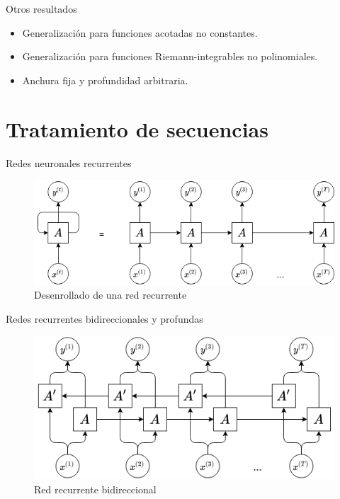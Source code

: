 \documentclass[spanish]{beamer}
\begin{document}
\begin{frame}{Otros resultados}

\begin{itemize}
\item Generalización para funciones acotadas no constantes.
\item Generalización para funciones Riemann-integrables no polinomiales.
\item Anchura fija y profundidad arbitraria.
\end{itemize}

\end{frame}

\section{Tratamiento de secuencias}

\begin{frame}{Redes neuronales recurrentes}

\begin{figure}
\includegraphics[scale=0.5]{img/recurrent.png}
\caption{Desenrollado de una red recurrente}
\end{figure}

\end{frame}

\begin{frame}{Redes recurrentes bidireccionales y profundas}

\begin{figure}
\includegraphics[scale=0.5]{img/bidirectional.png}
\caption{Red recurrente bidireccional}
\end{figure}

\end{frame}
\end{document}
